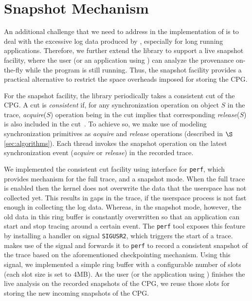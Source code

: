 \section{Snapshot Mechanism}
\label{sec:snapshot}
An additional challenge that we need to address in the implementation of \projecttitle is to deal with the excessive log data produced by \intelpt, especially for long running applications. Therefore, we further extend the library to support a live snapshot facility, where the user (or an application using \projecttitle) can analyze the provenance on-the-fly while the program is still running. Thus, the snapshot facility provides a practical alternative to restrict the space overheads imposed for storing the CPG. 

For the snapshot facility, the library periodically takes a consistent cut of the CPG. A cut is {\em consistent} if, for any synchronization operation on object $S$ in the trace,  {\em acquire}($S$) operation being in the cut implies that corresponding {\em release}($S$) is also included in the cut~\cite{chandy-lamport}.  To achieve so, we make use of modeling synchronization primitives as {\em acquire} and {\em release} operations (described in $\S$\ref{sec:algorithms}). Each thread invokes the snapshot operation on the latest synchronization event ({\em acquire} or {\em release}) in the recorded trace.


We implemented the consistent cut facility using \intelpt interface for {\tt perf},
which provides mechanism for the full trace, and a snapshot mode.
When the full trace is enabled then the kernel does not overwrite the data that the userspace has not collected yet. %
This results in gaps in the trace, if the userspace process is not fast enough in collecting the log data. 
Whereas, in the snapshot mode, however, the old data in this ring buffer is constantly overwritten so that an application
can start and stop tracing around a certain event. %
The {\tt perf} tool exposes this feature by installing a handler on
signal {\tt SIGUSR2}, which triggers the start of a trace. \projecttitle makes use of the signal
and forwards it to {\tt perf} to record a consistent snapshot of the trace based on the aforementioned checkpointing mechanism.  Using this signal, we implemented a simple ring buffer with a configurable number of slots (each slot size is set to $4$MB). As the user (or the application using \projecttitle) finishes the live analysis on the recorded snapshots of the CPG, we reuse those slots for storing the new incoming snapshots of the CPG. %


